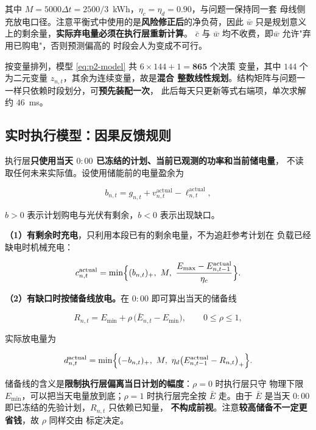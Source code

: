 \documentclass[withoutpreface,bwprint]{cumcmthesis}
\begin{document}
其中 $M=5000\Delta t=2500/3$~kWh，$\eta_c=\eta_d=0.90$，与问题一保持同一套
母线侧充放电口径。注意平衡式中使用的是\textbf{风险修正后}的净负荷，因此
$\bar w$ 只是规划意义上的剩余量，\textbf{实际弃电量必须在执行层重新计算}。
$\bar c$ 与 $\bar w$ 均不收费，即$\bar w$ 允许"弃用已购电"，否则预测偏高的
时段会人为变成不可行。

按变量排列，模型 \eqref{eq:p2-model} 共 $6\times144+1=\mathbf{865}$ 个决策
变量，其中 $144$ 个为二元变量 $z_{n,t}$，其余为连续变量，故是\textbf{混合
整数线性规划}。结构矩阵与问题一一样只依赖时段划分，可\textbf{预先装配一次}，
此后每天只更新等式右端项，单次求解约 $46$~ms。

\subsection{实时执行模型：因果反馈规则}

执行层\textbf{只使用当天 $0{:}00$ 已冻结的计划、当前已观测的功率和当前储电量}，
不读取任何未来实际值。设使用储能前的电量盈余为

\begin{equation}
  b_{n,t}=g_{n,t}+v_{n,t}^{\mathrm{actual}}-\ell_{n,t}^{\mathrm{actual}} ,
  \label{eq:p2-surplus}
\end{equation}

$b>0$ 表示计划购电与光伏有剩余，$b<0$ 表示出现缺口。

\textbf{（1）有剩余时充电}，只利用本段已有的剩余电量，不为追赶参考计划在
负载已经缺电时机械充电：

\begin{equation}
  c_{n,t}^{\mathrm{actual}}
  =\min\Bigl\{(b_{n,t})_+,\ M,\
  \frac{E_{\max}-E_{n,t-1}^{\mathrm{actual}}}{\eta_c}\Bigr\} .
  \label{eq:p2-charge}
\end{equation}

\textbf{（2）有缺口时按储备线放电。}在 $0{:}00$ 即可算出当天的储备线

\begin{equation}
  R_{n,t}=E_{\min}+\rho\,\bigl(\bar E_{n,t}-E_{\min}\bigr),\qquad 0\le\rho\le1 ,
  \label{eq:p2-reserve}
\end{equation}

实际放电量为

\begin{equation}
  d_{n,t}^{\mathrm{actual}}
  =\min\Bigl\{(-b_{n,t})_+,\ M,\
  \eta_d\bigl(E_{n,t-1}^{\mathrm{actual}}-R_{n,t}\bigr)_+\Bigr\} .
  \label{eq:p2-discharge}
\end{equation}

储备线的含义是\textbf{限制执行层偏离当日计划的幅度}：$\rho=0$ 时执行层只守
物理下限 $E_{\min}$，可以把当天电量放到底；$\rho=1$ 时执行层完全按 $\bar E$
走。由于 $\bar E$ 是当天 $0{:}00$ 即已冻结的先验计划，$R_{n,t}$ 只依赖已知量，
\textbf{不构成前视}。注意\textbf{较高储备不一定更省钱}，故 $\rho$ 同样交由
标定决定。
\end{document}

